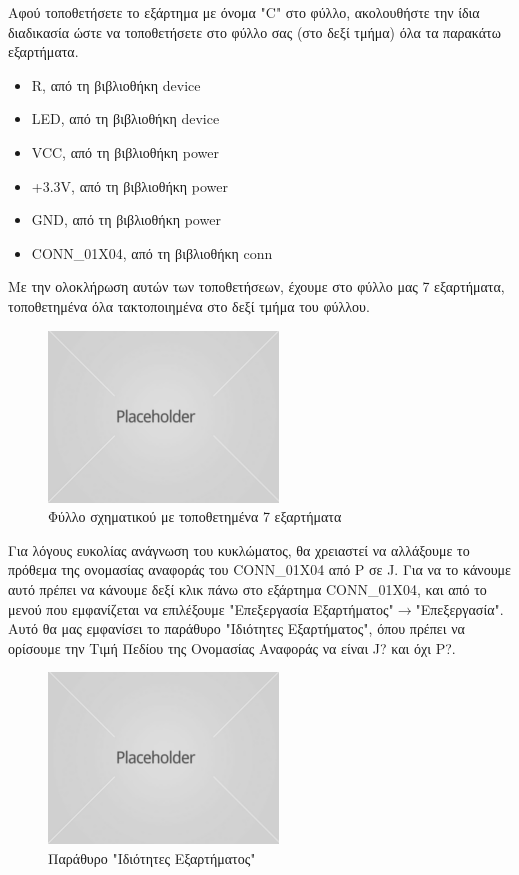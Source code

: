 \documentclass[a4paper]{article}
\begin{document}
Αφού τοποθετήσετε το εξάρτημα με όνομα "C" στο φύλλο, ακολουθήστε την ίδια διαδικασία ώστε να τοποθετήσετε στο φύλλο σας (στο δεξί τμήμα) όλα τα παρακάτω εξαρτήματα. 

\begin{itemize}
    \item R, από τη βιβλιοθήκη device
    \item LED, από τη βιβλιοθήκη device
    \item VCC, από τη βιβλιοθήκη power
    \item +3.3V, από τη βιβλιοθήκη power
    \item GND, από τη βιβλιοθήκη power
    \item CONN\_01X04, από τη βιβλιοθήκη conn
\end{itemize}

Με την ολοκλήρωση αυτών των τοποθετήσεων, έχουμε στο φύλλο μας 7 εξαρτήματα, τοποθετημένα όλα τακτοποιημένα στο δεξί τμήμα του φύλλου.

\begin{figure}
  \begin{center}
    \includegraphics{img/kicad-main.png}
    \caption{Φύλλο σχηματικού με τοποθετημένα 7 εξαρτήματα}
    \label{fig:kicad-main}
  \end{center}
\end{figure}

Για λόγους ευκολίας ανάγνωση του κυκλώματος, θα χρειαστεί να αλλάξουμε το πρόθεμα της ονομασίας αναφοράς του CONN\_01X04 από P σε J. Για να το κάνουμε αυτό πρέπει να κάνουμε δεξί κλικ πάνω στο εξάρτημα CONN\_01X04, και από το μενού που εμφανίζεται να επιλέξουμε "Επεξεργασία Εξαρτήματος"$\rightarrow$"Επεξεργασία". Αυτό θα μας εμφανίσει το παράθυρο "Ιδιότητες Εξαρτήματος", όπου πρέπει να ορίσουμε την Τιμή Πεδίου της Ονομασίας Αναφοράς να είναι J? και όχι P?.

\begin{figure}
  \begin{center}
    \includegraphics{img/kicad-main.png}
    \caption{Παράθυρο "Ιδιότητες Εξαρτήματος"}
    \label{fig:kicad-main}
  \end{center}
\end{figure}
\end{document}
